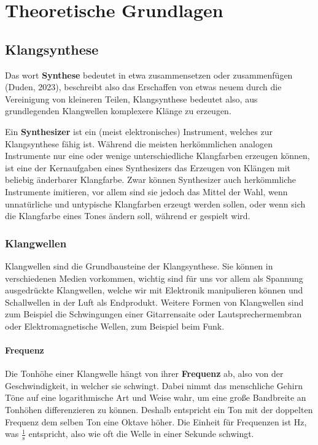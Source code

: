 \chapter{Theoretische Grundlagen}

\section{Klangsynthese}
\label{sec:org03cb44d}
Das wort \textbf{Synthese} bedeutet in etwa zusammensetzen oder zusammenfügen ({Duden}, 2023), beschreibt also das Erschaffen von etwas neuem durch die Vereinigung von kleineren Teilen, Klangsynthese bedeutet also, aus grundlegenden Klangwellen komplexere Klänge zu erzeugen.

Ein \textbf{Synthesizer} ist ein (meist elektronisches) Instrument, welches zur Klangsynthese fähig ist. Während die meisten herkömmlichen analogen Instrumente nur eine oder wenige unterschiedliche Klangfarben erzeugen können, ist eine der Kernaufgaben eines Synthesizers das Erzeugen von Klängen mit beliebig änderbarer Klangfarbe. Zwar können Synthesizer auch herkömmliche Instrumente imitieren, vor allem sind sie jedoch das Mittel der Wahl, wenn unnatürliche und untypische Klangfarben erzeugt werden sollen, oder wenn sich die Klangfarbe eines Tones ändern soll, während er gespielt wird.

\subsection{Klangwellen}
\label{sec:org526fdf5}
Klangwellen sind die Grundbausteine der Klangsynthese. Sie können in verschiedenen Medien vorkommen, wichtig sind für uns vor allem als Spannung ausgedrückte Klangwellen, welche wir mit Elektronik manipulieren können und Schallwellen in der Luft als Endprodukt. Weitere Formen von Klangwellen sind zum Beispiel die Schwingungen einer Gitarrensaite oder Lautsprechermembran oder Elektromagnetische Wellen, zum Beispiel beim Funk.

\subsubsection{Frequenz}
\label{sec:org4454484}
Die Tonhöhe einer Klangwelle hängt von ihrer \textbf{Frequenz} ab, also von der Geschwindigkeit, in welcher sie schwingt. Dabei nimmt das menschliche Gehirn Töne auf eine logarithmische Art und Weise wahr, um eine große Bandbreite an Tonhöhen differenzieren zu können. Deshalb entspricht ein Ton mit der doppelten Frequenz dem selben Ton eine Oktave höher. Die Einheit für Frequenzen ist \si{\hertz}, was \(\frac{1}{\si{\second}}\) entspricht, also wie oft die Welle in einer Sekunde schwingt.

